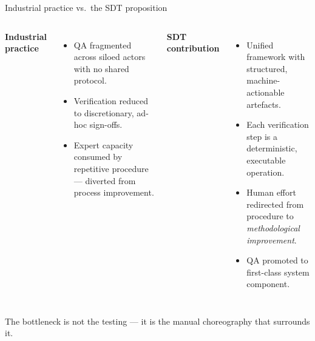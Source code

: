 \documentclass[11pt,aspectratio=169]{beamer}
\begin{document}
\begin{frame}{Industrial practice vs.\ the SDT proposition}

\begin{columns}[T,onlytextwidth]

\textbf{\textcolor{sdtred}{Industrial practice}}\\[0.4em]
\footnotesize
\begin{itemize}\setlength\itemsep{0.25em}
\item QA fragmented across siloed actors with no shared protocol.
\item Verification reduced to discretionary, ad-hoc sign-offs.
\item Expert capacity consumed by repetitive procedure --- diverted from
  process improvement.
\end{itemize}

\textbf{\textcolor{sdtgreen}{SDT contribution}}\\[0.4em]
\footnotesize
\begin{itemize}\setlength\itemsep{0.25em}
\item Unified framework with structured, machine-actionable artefacts.
\item Each verification step is a deterministic, executable operation.
\item Human effort redirected from procedure to
  \emph{methodological improvement}.
\item QA promoted to \alert{first-class system component}.
\end{itemize}

\end{columns}

\vspace{0.8em}
\begin{center}
\alert{The bottleneck is not the testing --- it is the manual
choreography that surrounds it.}
\end{center}

\end{frame}
\end{document}
